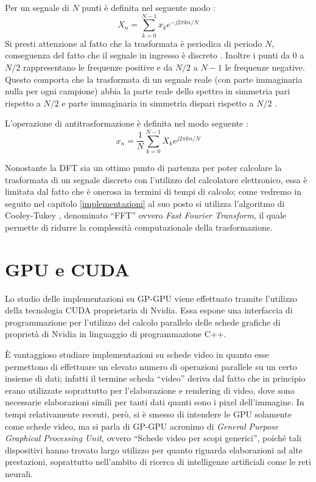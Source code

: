 Per un segnale di $N$ punti è definita nel seguente modo \cite[p.~2.50]{calandrino}:
\begin{equation}
    X_n = \displaystyle\sum_{k=0}^{N-1}x_k e^{-j 2\pi kn/N}
    \label{eq:dft}
\end{equation}
Si presti attenzione al fatto che la trasformata è periodica di periodo $N$, conseguenza del fatto che il segnale in ingresso è discreto \cite[p.~2.30]{calandrino}. Inoltre i punti da $0$ a $N/2$ rappresentano le frequenze positive e da $N/2$ a $N-1$ le frequenze negative. Questo comporta che la trasformata di un segnale reale (con parte immaginaria nulla per ogni campione) abbia la parte reale dello spettro in simmetria pari rispetto a $N/2$ e parte immaginaria in simmetria dispari rispetto a $N/2$ \cite[p.~570]{dspguide}.

L'operazione di antitrasformazione è definita nel modo seguente \cite[p.~2.50]{calandrino}:
\begin{equation}
    x_n = \frac{1}{N}\displaystyle\sum_{k=0}^{N-1}X_k e^{j 2\pi kn/N}
\end{equation}

Nonostante la DFT sia un ottimo punto di partenza per poter calcolare la trasformata di un segnale discreto con l'utilizzo del calcolatore elettronico, essa è limitata dal fatto che è onerosa in termini di tempi di calcolo; come vedremo in seguito nel capitolo \ref{implementazioni} al suo posto si utilizza l'algoritmo di Cooley-Tukey \cite{cooleytukey}, denominato ``FFT'' ovvero \textit{Fast Fourier Transform}, il quale permette di ridurre la complessità computazionale della trasformazione.

\section{GPU e CUDA}
Lo studio delle implementazioni su GP-GPU viene effettuato tramite l'utilizzo della tecnologia CUDA proprietaria di Nvidia. Essa espone una interfaccia di programmazione per l'utilizzo del calcolo parallelo delle schede grafiche di proprietà di Nvidia in linguaggio di programmazione C++.

È vantaggioso studiare implementazioni su schede video in quanto esse permettono di effettuare un elevato numero di operazioni parallele su un certo insieme di dati; infatti il termine scheda ``video'' deriva dal fatto che in principio erano utilizzate soprattutto per l'elaborazione e rendering di video, dove sono necessarie elaborazioni simili per tanti dati quanti sono i pixel dell'immagine. In tempi relativamente recenti, però, si è smesso di intendere le GPU solamente come schede video, ma si parla di GP-GPU acronimo di \textit{General Purpose Graphical Processing Unit}, ovvero ``Schede video per scopi generici'', poiché tali dispositivi hanno trovato largo utilizzo per quanto riguarda elaborazioni ad alte prestazioni, soprattutto nell'ambito di ricerca di intelligenze artificiali come le reti neurali.

